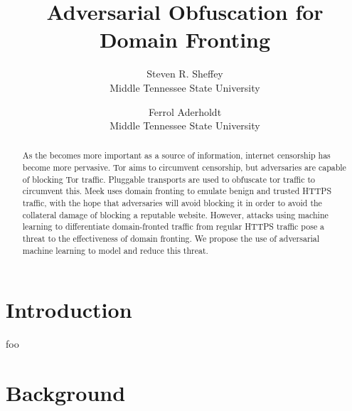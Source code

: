 

\date{}

\title{\Large Adversarial Obfuscation for Domain Fronting}

\author{
{\rm Steven R. Sheffey}\\
Middle Tennessee State University
\and
{\rm Ferrol Aderholdt}\\
Middle Tennessee State University
} %

\maketitle

\begin{abstract}
As the becomes more important as a source of information, internet censorship has become more pervasive. Tor aims to circumvent censorship, but adversaries are capable of blocking Tor traffic. Pluggable transports are used to obfuscate tor traffic to circumvent this. Meek uses domain fronting to emulate benign and trusted HTTPS traffic, with the hope that adversaries will avoid blocking it in order to avoid the collateral damage of blocking a reputable website. However, attacks using machine learning to differentiate domain-fronted traffic from regular HTTPS traffic pose a threat to the effectiveness of domain fronting. We propose the use of adversarial machine learning to model and reduce this threat.
\end{abstract}


\section{Introduction}
foo
\nocite{*}


\section{Background}

